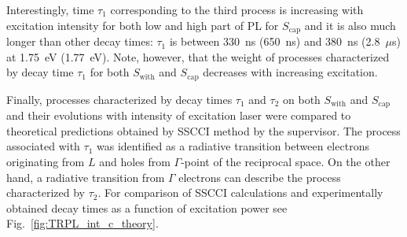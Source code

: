 {{%








Interestingly, time $\tau_1$ corresponding to the third process is increasing with excitation intensity for both low and high part of PL for $S_\mathrm{cap}$ and it is also much longer than other decay times: $\tau_1$ is between 330~ns (650~ns) and 380~ns (2.8~$\mu$s) at 1.75~eV (1.77~eV). Note, however, that the weight of processes characterized by decay time $\tau_1$ for both $S_\mathrm{with}$ and $S_\mathrm{cap}$ decreases with increasing excitation.


Finally, processes characterized by decay times $\tau_1$ and $\tau_2$ on both $S_\mathrm{with}$ and $S_\mathrm{cap}$ and their evolutions with intensity of excitation laser were compared to theoretical predictions obtained by SSCCI method by the supervisor. The process associated with $\tau_1$ was identified as a radiative transition between electrons originating from $L$ and holes from $\Gamma$-point of the reciprocal space. On the other hand, a radiative transition from $\Gamma$ electrons can describe the process characterized by $\tau_2$. For comparison of SSCCI calculations and experimentally obtained decay times as a function of excitation power see Fig.~\ref{fig:TRPL_int_c_theory}.


}}
